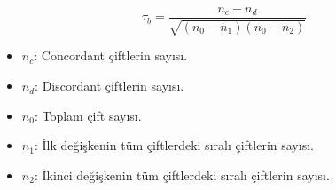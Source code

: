 \[ \tau_b = \frac{n_c - n_d}{\sqrt{(n_0 - n_1)(n_0 - n_2)}} \]

\begin{itemize}
	\item $n_c$: Concordant çiftlerin sayısı.
	\item $n_d$: Discordant çiftlerin sayısı.
	\item $n_0$: Toplam çift sayısı.
	\item $n_1$: İlk değişkenin tüm çiftlerdeki sıralı çiftlerin sayısı.
	\item $n_2$: İkinci değişkenin tüm çiftlerdeki sıralı çiftlerin sayısı.
\end{itemize}

\newpage